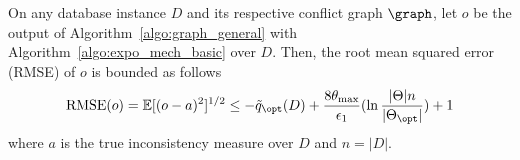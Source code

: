 \begin{theorem}\label{thm:graph_general_utility} On any database instance $D$ and its respective conflict graph $\graph$, let $o$ be the output of Algorithm~\ref{algo:graph_general} with Algorithm~\ref{algo:expo_mech_basic} over $D$.  
Then,  
the root mean squared error (RMSE) of $o$ is bounded as follows %
\begin{equation}
\text{RMSE}(o) = \mathbb{E}[(o-a)^2]^{1/2}  \leq -\tilde{q}_{\opt}(D) + \frac{8 \theta_{\max}}{\epsilon_1} (\ln \frac{|\Theta|n}{|\Theta_{\opt}|}) + 1
\end{equation}
where $a$ is the true inconsistency measure over $D$ and $n=|D|$. 
\end{theorem}
